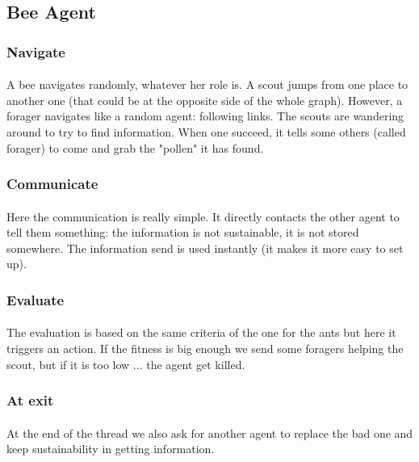 \documentclass{article}
\begin{document}
	\subsection{Bee Agent}
		\subsubsection{Navigate}
			\paragraph{}
				A bee navigates randomly, whatever her role is.
				A scout jumps from one place to another one (that could be at the opposite side of the whole graph).
				However, a forager navigates like a random agent: following links.
				The scouts are wandering around to try to find information.
				When one succeed, it tells some others (called forager) to come and grab the "pollen" it has found.
		\subsubsection{Communicate}
			\paragraph{}
				Here the communication is really simple.
				It directly contacts the other agent to tell them something:
				the information is not sustainable, it is not stored somewhere.
				The information send is used instantly (it makes it more easy to set up).
		\subsubsection{Evaluate}
			\paragraph{}
				The evaluation is based on the same criteria of the one for the ants but here it triggers an action.
				If the fitness is big enough we send some foragers helping the scout, but if it is too low ... the agent get killed.
		\subsubsection{At exit}
			\paragraph{}
				At the end of the thread we also ask for another agent to replace the bad one and keep sustainability in getting information.
\end{document}
